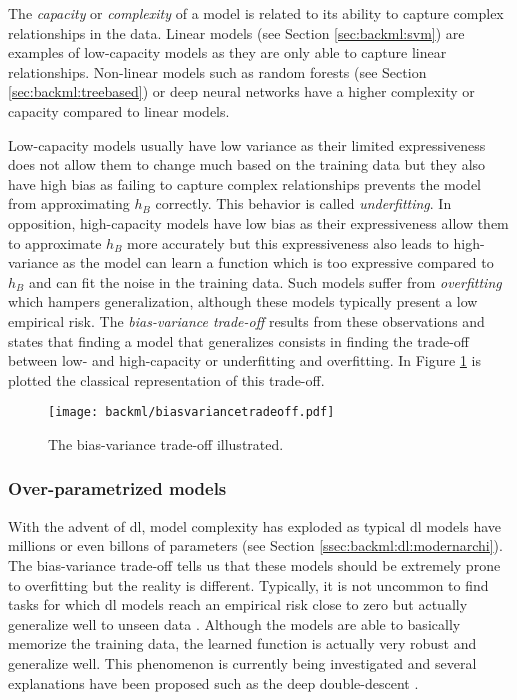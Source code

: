 The \textit{capacity} or \textit{complexity} of a model is related to its ability
to capture complex relationships in the data. Linear models (see Section
\ref{sec:backml:svm}) are examples of low-capacity models as they are only able
to capture linear relationships. Non-linear models such as random forests (see
Section \ref{sec:backml:treebased}) or deep neural networks have a higher complexity
or capacity compared to linear models.

Low-capacity models usually have low variance as their limited expressiveness does
not allow them to change much based on the training data but they also have high
bias as failing to capture complex relationships prevents the model from approximating
$h_B$ correctly. This behavior is called \textit{underfitting}. In opposition,
high-capacity models have low bias as their expressiveness allow them to approximate
$h_B$ more accurately but this expressiveness also leads to high-variance as the
model can learn a function which is too expressive compared to $h_B$ and can fit
the noise in the training data. Such models suffer from \textit{overfitting} which
hampers generalization, although these models typically present a low empirical
risk. The \textit{bias-variance trade-off} results from these observations and
states that finding a model that generalizes consists in finding the trade-off
between low- and high-capacity or underfitting and overfitting. In Figure
\ref{fig:backml:biasvariancetradeoff} is plotted the classical representation of
this trade-off.

\begin{figure}
  \centering
  \texttt{[image: backml/biasvariancetradeoff.pdf]}
  \caption{The bias-variance trade-off illustrated.}
  \label{fig:backml:biasvariancetradeoff}
\end{figure}

\subsubsection{Over-parametrized models}

With the advent of \acrlong{dl}, model complexity has exploded as typical \acrlong{dl}
models have millions or even billons of parameters (see Section
\ref{ssec:backml:dl:modernarchi}). The bias-variance trade-off tells us that these
models should be extremely prone to overfitting but the reality is different.
Typically, it is not uncommon to find tasks for which \acrlong{dl} models reach
an empirical risk close to zero but actually generalize well to unseen data
\parencite{zhang2021understanding}. Although the models are able to basically
memorize the training data, the learned function is actually very robust and
generalize well. This phenomenon is currently being investigated and several
explanations have been proposed such as the deep double-descent
\parencite{belkin2019reconciling}.

